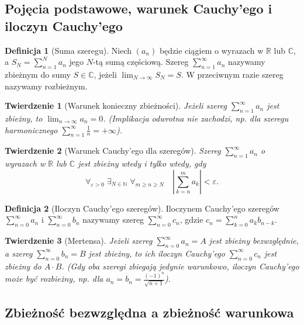\documentclass[11pt, a4paper]{article}
\theoremstyle{plain}
\newtheorem*{twierdzenie}{Twierdzenie}
\theoremstyle{definition}
\newtheorem*{definicja}{Definicja}
\begin{document}
\subsection{Pojęcia podstawowe, warunek Cauchy'ego i iloczyn Cauchy'ego}

\begin{definicja}[Suma szeregu]
Niech $(a_n)$ będzie ciągiem o wyrazach w $\mathbb{R}$ lub $\mathbb{C}$, a $S_N = \sum_{n=1}^N a_n$ jego $N$-tą sumą częściową. Szereg $\sum_{n=1}^\infty a_n$ nazywamy zbieżnym do sumy $S \in \mathbb{C}$, jeżeli $\lim_{N\to\infty} S_N = S$. W przeciwnym razie szereg nazywamy rozbieżnym.
\end{definicja}

\begin{twierdzenie}[Warunek konieczny zbieżności]
Jeżeli szereg $\sum_{n=1}^\infty a_n$ jest zbieżny, to $\lim_{n\to\infty} a_n = 0$. (Implikacja odwrotna nie zachodzi, np. dla szeregu harmonicznego $\sum_{n=1}^\infty \frac{1}{n} = +\infty$).
\end{twierdzenie}

\begin{twierdzenie}[Warunek Cauchy'ego dla szeregów]
Szereg $\sum_{n=1}^\infty a_n$ o wyrazach w $\mathbb{R}$ lub $\mathbb{C}$ jest zbieżny wtedy i tylko wtedy, gdy
\[
\forall_{\varepsilon > 0} \; \exists_{N \in \mathbb{N}} \; \forall_{m \geqslant n \geqslant N} \quad \left\lvert \sum_{k=n}^{m} a_k \right\rvert < \varepsilon.
\]
\end{twierdzenie}

\begin{definicja}[Iloczyn Cauchy'ego szeregów]
Iloczynem Cauchy'ego szeregów $\sum_{n=0}^\infty a_n$ i $\sum_{n=0}^\infty b_n$ nazywamy szereg $\sum_{n=0}^\infty c_n$, gdzie $c_n = \sum_{k=0}^n a_k b_{n-k}$.
\end{definicja}

\begin{twierdzenie}[Mertensa]
Jeżeli szereg $\sum_{n=0}^\infty a_n = A$ jest zbieżny bezwzględnie, a szereg $\sum_{n=0}^\infty b_n = B$ jest zbieżny, to ich iloczyn Cauchy'ego $\sum_{n=0}^\infty c_n$ jest zbieżny do $A \cdot B$. (Gdy oba szeregi zbiegają jedynie warunkowo, iloczyn Cauchy'ego może być rozbieżny, np. dla $a_n = b_n = \frac{(-1)^n}{\sqrt{n+1}}$).
\end{twierdzenie}

\subsection{Zbieżność bezwzględna a zbieżność warunkowa}
\end{document}

